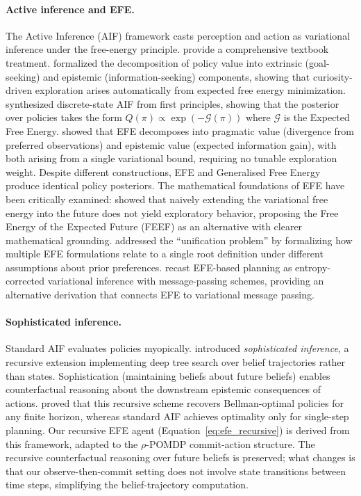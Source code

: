 \documentclass{article}
\begin{document}
\paragraph{Active inference and EFE.}
The Active Inference (AIF) framework \citep{friston2010} casts perception and action as variational inference under the free-energy principle. \citet{parr2022} provide a comprehensive textbook treatment. \citet{friston2015} formalized the decomposition of policy value into extrinsic (goal-seeking) and epistemic (information-seeking) components, showing that curiosity-driven exploration arises automatically from expected free energy minimization. \citet{dacosta2020} synthesized discrete-state AIF from first principles, showing that the posterior over policies takes the form $Q(\pi) \propto \exp(-\mathcal{G}(\pi))$ where $\mathcal{G}$ is the Expected Free Energy. \citet{parr2019} showed that EFE decomposes into pragmatic value (divergence from preferred observations) and epistemic value (expected information gain), with both arising from a single variational bound, requiring no tunable exploration weight. Despite different constructions, EFE and Generalised Free Energy produce identical policy posteriors. The mathematical foundations of EFE have been critically examined: \citet{millidge2021} showed that naively extending the variational free energy into the future does not yield exploratory behavior, proposing the Free Energy of the Expected Future (FEEF) as an alternative with clearer mathematical grounding. \citet{champion2024} addressed the ``unification problem'' by formalizing how multiple EFE formulations relate to a single root definition under different assumptions about prior preferences. \citet{devries2025} recast EFE-based planning as entropy-corrected variational inference with message-passing schemes, providing an alternative derivation that connects EFE to variational message passing.

\paragraph{Sophisticated inference.}
Standard AIF evaluates policies myopically. \citet{friston2021} introduced \emph{sophisticated inference}, a recursive extension implementing deep tree search over belief trajectories rather than states. Sophistication (maintaining beliefs about future beliefs) enables counterfactual reasoning about the downstream epistemic consequences of actions. \citet{dacosta2020b} proved that this recursive scheme recovers Bellman-optimal policies for any finite horizon, whereas standard AIF achieves optimality only for single-step planning. Our recursive EFE agent (Equation~\ref{eq:efe_recursive}) is derived from this framework, adapted to the $\rho$-POMDP commit-action structure. The recursive counterfactual reasoning over future beliefs is preserved; what changes is that our observe-then-commit setting does not involve state transitions between time steps, simplifying the belief-trajectory computation.
\end{document}
